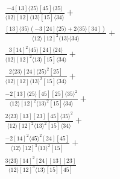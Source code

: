 \documentclass[varwidth, border=5pt]{standalone}
\begin{document}
\begin{my}
$\begin{gathered}
\scriptscriptstyle\frac{-4[13]⟨25⟩[45]⟨35⟩}{⟨12⟩[12]⟨13⟩[15]⟨34⟩}+\\
\scriptscriptstyle\frac{[13]⟨35⟩(-3[24]⟨25⟩+2⟨35⟩[34])}{⟨12⟩[12]^2⟨13⟩⟨34⟩}+\\
\scriptscriptstyle\frac{3[14]^2⟨45⟩[24]⟨24⟩}{⟨12⟩[12]^2⟨13⟩[15]⟨34⟩}+\\
\scriptscriptstyle\frac{2⟨23⟩[24]⟨25⟩^2[25]}{⟨12⟩[12]⟨13⟩^2[15]⟨34⟩}+\\
\scriptscriptstyle\frac{-2[13]⟨25⟩[45][25]⟨35⟩^2}{⟨12⟩[12]^2⟨13⟩^2[15]⟨34⟩}+\\
\scriptscriptstyle\frac{2⟨23⟩[13][23][45]⟨35⟩^2}{⟨12⟩[12]^2⟨13⟩^2[15]⟨34⟩}+\\
\scriptscriptstyle\frac{-2[14]^2⟨45⟩^2[24][45]}{⟨12⟩[12]^3⟨13⟩^2[15]}+\\
\scriptscriptstyle\frac{3⟨23⟩[14]^2[24][13][23]}{⟨12⟩[12]^3⟨13⟩[15][45]}\phantom{+}
\end{gathered}$
\end{my}
\end{document}
